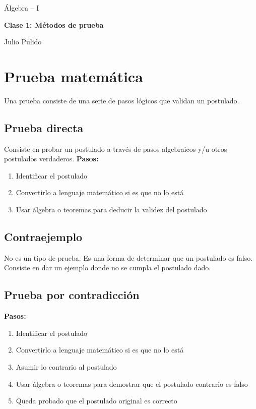 \documentclass[spanish,12pt]{article}
\begin{document}
	\begin{titlepage}
	\begin{center}
	\hspace{0pt}
	\vfill
	Álgebra – I
	\medskip
	
	{\Large\textbf{{Clase 1: Métodos de prueba}}}
	
	\medskip
	Julio Pulido
	\thispagestyle{empty}
	\vfill
	\end{center}
	\end{titlepage}
\newpage
\section{Prueba matemática}
Una prueba consiste de una serie de pasos lógicos que validan un postulado.
\subsection{Prueba directa}
Consiste en probar un postulado a través de pasos algebraicos y/u otros postulados verdaderos.
\textbf{Pasos:}
\begin{enumerate}
    \item Identificar el postulado
    \item Convertirlo a lenguaje matemático si es que no lo está
    \item Usar álgebra o teoremas para deducir la validez del postulado
\end{enumerate}
\newpage
\subsection{Contraejemplo}
No es un tipo de prueba. Es una forma de determinar que un postulado es falso. Consiste en dar un ejemplo donde no se cumpla el postulado dado.
\subsection{Prueba por contradicción}
\textbf{Pasos:}
\begin{enumerate}
    \item Identificar el postulado
    \item Convertirlo a lenguaje matemático si es que no lo está
    \item Asumir lo contrario al postulado
    \item Usar álgebra o teoremas para demostrar que el postulado contrario es falso
    \item Queda probado que el postulado original es correcto
\end{enumerate}
\newpage
\end{document}
